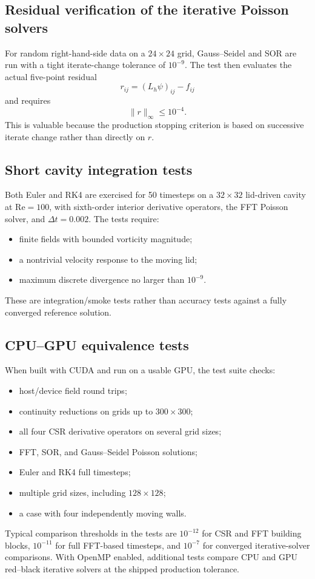 \documentclass[11pt,a4paper]{article}
\newcommand{\Rey}{\mathrm{Re}}
\newcommand{\dt}{\Delta t}
\begin{document}
\subsection{Residual verification of the iterative Poisson solvers}

For random right-hand-side data on a $24\times24$ grid, Gauss--Seidel and SOR are run with a tight iterate-change tolerance of $10^{-9}$.  The test then evaluates the actual five-point residual
\begin{equation}
r_{ij}=\left(L_h\psi\right)_{ij}-f_{ij}
\end{equation}
and requires
\begin{equation}
\|r\|_{\infty}\le 10^{-4}.
\end{equation}
This is valuable because the production stopping criterion is based on successive iterate change rather than directly on $r$.

\subsection{Short cavity integration tests}

Both Euler and RK4 are exercised for 50 timesteps on a $32\times32$ lid-driven cavity at $\Rey=100$, with sixth-order interior derivative operators, the FFT Poisson solver, and $\dt=0.002$.  The tests require:
\begin{itemize}[leftmargin=2em]
  \item finite fields with bounded vorticity magnitude;
  \item a nontrivial velocity response to the moving lid;
  \item maximum discrete divergence no larger than $10^{-9}$.
\end{itemize}
These are integration/smoke tests rather than accuracy tests against a fully converged reference solution.

\subsection{CPU--GPU equivalence tests}

When built with CUDA and run on a usable GPU, the test suite checks:
\begin{itemize}[leftmargin=2em]
  \item host/device field round trips;
  \item continuity reductions on grids up to $300\times300$;
  \item all four CSR derivative operators on several grid sizes;
  \item FFT, SOR, and Gauss--Seidel Poisson solutions;
  \item Euler and RK4 full timesteps;
  \item multiple grid sizes, including $128\times128$;
  \item a case with four independently moving walls.
\end{itemize}
Typical comparison thresholds in the tests are $10^{-12}$ for CSR and FFT building blocks, $10^{-11}$ for full FFT-based timesteps, and $10^{-7}$ for converged iterative-solver comparisons.  With OpenMP enabled, additional tests compare CPU and GPU red--black iterative solvers at the shipped production tolerance.
\end{document}
